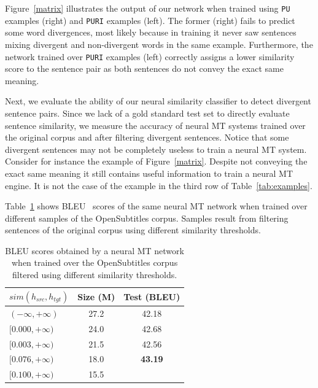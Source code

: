\documentclass[11pt,a4paper]{article}
\begin{document}
Figure~\ref{matrix} illustrates the output of our network when trained using \texttt{PU} examples (right) and \texttt{PURI} examples (left).  
The former (right) fails to predict some word divergences, most likely because in training it never saw sentences mixing divergent and non-divergent words in the same example. 
Furthermore, the network trained over \texttt{PURI} examples (left) correctly assigns a lower similarity score to the sentence pair as both sentences do not convey the exact same meaning.

Next, we evaluate the ability of our neural similarity classifier to detect divergent sentence pairs. 
Since we lack of a gold standard test set to directly evaluate sentence similarity, 
we measure the accuracy of neural MT systems trained over the original corpus and after filtering divergent sentences. 
Notice that some divergent sentences may not be completely useless to train a neural MT system. 
Consider for instance the example of Figure~\ref{matrix}. 
Despite not conveying the exact same meaning it still contains useful information to train a neural MT engine. 
It is not the case of the example in the third row of Table~\ref{tab:examples}.

Table~\ref{results_wemb} shows BLEU~\cite{P02-1040} scores of the same neural MT network when trained over different samples of the OpenSubtitles corpus.
Samples result from filtering sentences of the original corpus using different similarity thresholds.

\begin{table}[h]
\small
\center
\begin{tabular}{lcc}
\hline
\bf $sim(h_{src},h_{tgt})$ & \bf Size (M) & \bf Test (BLEU)\\%
\hline
$(-\infty,+\infty)$   & 27.2 & 42.18 \\ %
$[0.000,+\infty)$   & 24.0 & 42.68 \\ %
$[0.003,+\infty)$   & 21.5 & 42.56 \\ %
$[0.076,+\infty)$   & 18.0 & \bf 43.19 \\ %
$[0.100,+\infty)$   & 15.5 & \\%
\hline
\end{tabular}
\caption{BLEU scores obtained by a neural MT network when trained over the OpenSubtitles corpus filtered using different similarity thresholds.}
\label{results_wemb}
\end{table}
\end{document}
